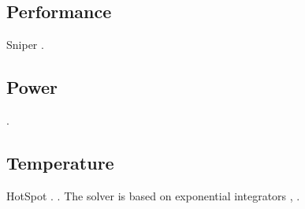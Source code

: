 \subsection{Performance}
Sniper \cite{carlson2011}.


\subsection{Power}
 \cite{li2009}.

\subsection{Temperature}
HotSpot \cite{skadron2004}.
 \cite{sridhar2010}.
The solver is based on exponential integrators \cite{hochbruck2010},
\cite{ukhov2012}.
